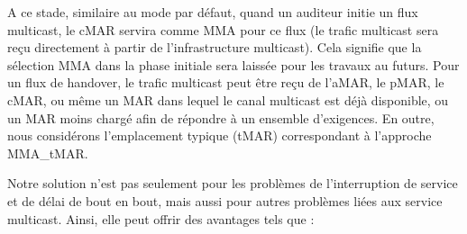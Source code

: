 A ce stade, similaire au mode par défaut, quand un auditeur initie un flux multicast, le cMAR servira comme MMA pour ce flux (le trafic multicast sera reçu directement à partir de l'infrastructure multicast). Cela signifie que la sélection MMA dans la phase initiale sera laissée pour les travaux au futurs. Pour un flux de handover, le trafic multicast peut être reçu de l'aMAR, le pMAR, le cMAR, ou même un MAR dans lequel le canal multicast est déjà disponible, ou un MAR moins chargé afin de répondre à un ensemble d'exigences. En outre, nous considérons l'emplacement typique (tMAR) correspondant à l'approche MMA\_tMAR.


Notre solution n'est pas seulement pour les problèmes de l'interruption de service et de délai de bout en bout, mais aussi pour autres problèmes liées aux service multicast. Ainsi, elle peut offrir des avantages tels que :

